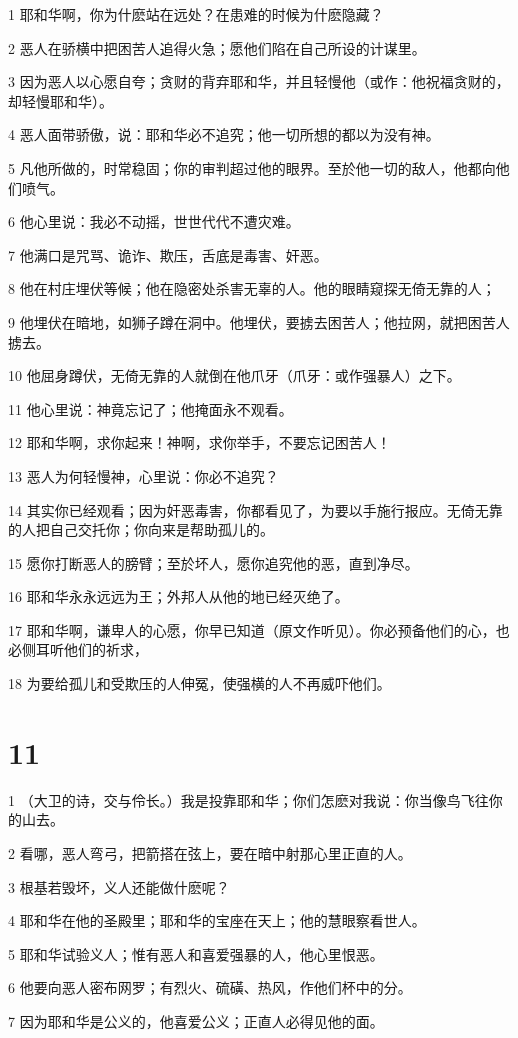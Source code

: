 \par 1 耶和华啊，你为什麽站在远处？在患难的时候为什麽隐藏？
\par 2 恶人在骄横中把困苦人追得火急；愿他们陷在自己所设的计谋里。
\par 3 因为恶人以心愿自夸；贪财的背弃耶和华，并且轻慢他（或作：他祝福贪财的，却轻慢耶和华）。
\par 4 恶人面带骄傲，说：耶和华必不追究；他一切所想的都以为没有神。
\par 5 凡他所做的，时常稳固；你的审判超过他的眼界。至於他一切的敌人，他都向他们喷气。
\par 6 他心里说：我必不动摇，世世代代不遭灾难。
\par 7 他满口是咒骂、诡诈、欺压，舌底是毒害、奸恶。
\par 8 他在村庄埋伏等候；他在隐密处杀害无辜的人。他的眼睛窥探无倚无靠的人；
\par 9 他埋伏在暗地，如狮子蹲在洞中。他埋伏，要掳去困苦人；他拉网，就把困苦人掳去。
\par 10 他屈身蹲伏，无倚无靠的人就倒在他爪牙（爪牙：或作强暴人）之下。
\par 11 他心里说：神竟忘记了；他掩面永不观看。
\par 12 耶和华啊，求你起来！神啊，求你举手，不要忘记困苦人！
\par 13 恶人为何轻慢神，心里说：你必不追究？
\par 14 其实你已经观看；因为奸恶毒害，你都看见了，为要以手施行报应。无倚无靠的人把自己交托你；你向来是帮助孤儿的。
\par 15 愿你打断恶人的膀臂；至於坏人，愿你追究他的恶，直到净尽。
\par 16 耶和华永永远远为王；外邦人从他的地已经灭绝了。
\par 17 耶和华啊，谦卑人的心愿，你早已知道（原文作听见）。你必预备他们的心，也必侧耳听他们的祈求，
\par 18 为要给孤儿和受欺压的人伸冤，使强横的人不再威吓他们。

\chapter{11}

\par 1 （大卫的诗，交与伶长。）我是投靠耶和华；你们怎麽对我说：你当像鸟飞往你的山去。
\par 2 看哪，恶人弯弓，把箭搭在弦上，要在暗中射那心里正直的人。
\par 3 根基若毁坏，义人还能做什麽呢？
\par 4 耶和华在他的圣殿里；耶和华的宝座在天上；他的慧眼察看世人。
\par 5 耶和华试验义人；惟有恶人和喜爱强暴的人，他心里恨恶。
\par 6 他要向恶人密布网罗；有烈火、硫磺、热风，作他们杯中的分。
\par 7 因为耶和华是公义的，他喜爱公义；正直人必得见他的面。

